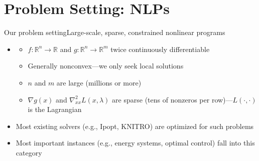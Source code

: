 \documentclass[aspectratio=169,11pt]{beamer}
\begin{document}
\section{Problem Setting: NLPs}
\begin{frame}{Our problem setting}{Large-scale, sparse, constrained nonlinear programs}
  \begin{itemize}
  \item {}
    \begin{itemize}
    \item<3-> $f:\mathbb{R}^n\to\mathbb{R}$ and $g:\mathbb{R}^n\to\mathbb{R}^m$ twice continuously differentiable
    \item<4-> Generally \alert{nonconvex}---we only seek \alert{local solutions}
    \item<5-> $n$ and $m$ are large (millions or more)
    \item<6-> $\nabla g(x)$ and $\nabla^2_{xx} L(x,\lambda)$ are \alert{sparse} (tens of nonzeros per row)---$L(\cdot,\cdot)$ is the Lagrangian
    \end{itemize}
  \item<7-> Most existing solvers (e.g., Ipopt, KNITRO) are optimized for such problems
  \item<8-> Most important instances (e.g., energy systems, optimal control) fall into this category
  \end{itemize}
\end{frame}

\end{document}
